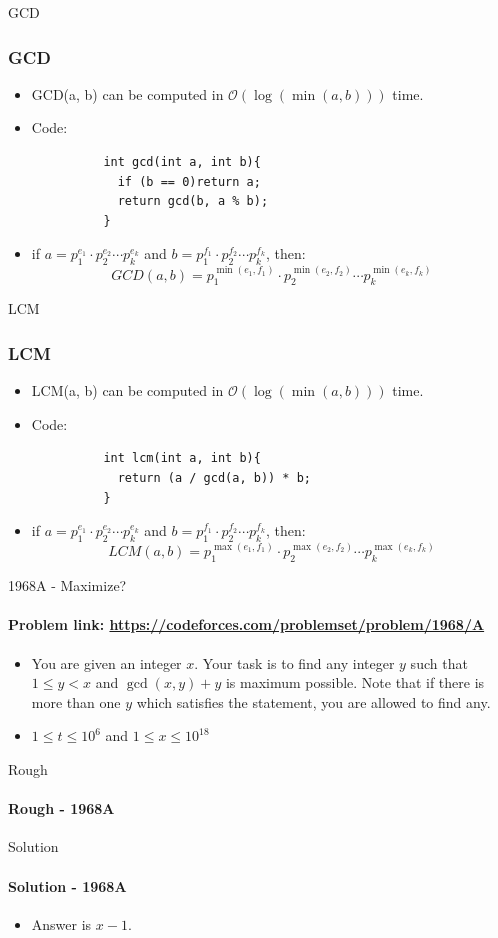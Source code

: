 \documentclass{beamer}
\begin{document}
\begin{frame}[fragile]{GCD}
  \frametitle{GCD}
  \begin{itemize}
    \item<1-> GCD(a, b) can be computed in $\mathcal{O}(\log(\min(a, b)))$ time.
    \item<2-> Code:
        \begin{verbatim}
          int gcd(int a, int b){
            if (b == 0)return a;
            return gcd(b, a % b);
          }
        \end{verbatim}
    \item<3-> if $a = p_1^{e_1} \cdot p_2^{e_2} \cdots p_k^{e_k}$ and $b = p_1^{f_1} \cdot p_2^{f_2} \cdots p_k^{f_k}$, then:
        \[
          GCD(a, b) = p_1^{\min(e_1, f_1)} \cdot p_2^{\min(e_2, f_2)} \cdots p_k^{\min(e_k, f_k)}
        \]
  \end{itemize}
\end{frame}

\begin{frame}[fragile]{LCM}
  \frametitle{LCM}
  \begin{itemize}
    \item<1-> LCM(a, b) can be computed in $\mathcal{O}(\log(\min(a, b)))$ time.
    \item<2-> Code:
        \begin{verbatim}
          int lcm(int a, int b){
            return (a / gcd(a, b)) * b;
          }
        \end{verbatim}
    \item<3-> if $a = p_1^{e_1} \cdot p_2^{e_2} \cdots p_k^{e_k}$ and $b = p_1^{f_1} \cdot p_2^{f_2} \cdots p_k^{f_k}$, then:
        \[
          LCM(a, b) = p_1^{\max(e_1, f_1)} \cdot p_2^{\max(e_2, f_2)} \cdots p_k^{\max(e_k, f_k)}
        \]
  \end{itemize}
\end{frame}
\begin{frame}{1968A - Maximize?}
  \framesubtitle{Problem link: \url{https://codeforces.com/problemset/problem/1968/A}}
  \begin{itemize}
    \item<1-> You are given an integer \( x \). Your task is to find any integer \( y \) such that \( 1 \leq y < x \) and \( \gcd(x, y) + y \) is maximum possible. Note that if there is more than one \( y \) which satisfies the statement, you are allowed to find any.    
    \item<2-> $1 \leq t \leq 10^6$ and $1 \leq x \leq 10^{18}$
  \end{itemize}
\end{frame}
\begin{frame}{Rough}
  \framesubtitle{Rough - 1968A}
\end{frame}
\begin{frame}{Solution}
  \framesubtitle{Solution - 1968A}
  \begin{itemize}
    \item<1-> Answer is $x-1$.
  \end{itemize}
\end{frame}
\end{document}
